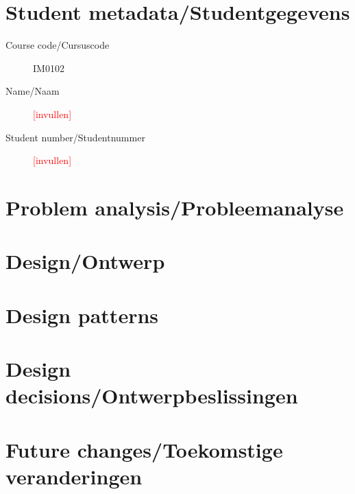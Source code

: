 \documentclass[a4paper]{article}
\newcommand{\todo}[1]{\textcolor{red}{[#1]}}
\begin{document}
\pagestyle{fancy}

\section*{Student metadata/Studentgegevens}
\begin{description}
	\item [Course code/Cursuscode] IM0102
	\item [Name/Naam] \todo{invullen}
	\item [Student number/Studentnummer] \todo{invullen}
\end{description}

\section{Problem analysis/Probleemanalyse}


\section{Design/Ontwerp}


\section{Design patterns}


\section{Design decisions/Ontwerpbeslissingen}


\section{Future changes/Toekomstige veranderingen}
\end{document}

